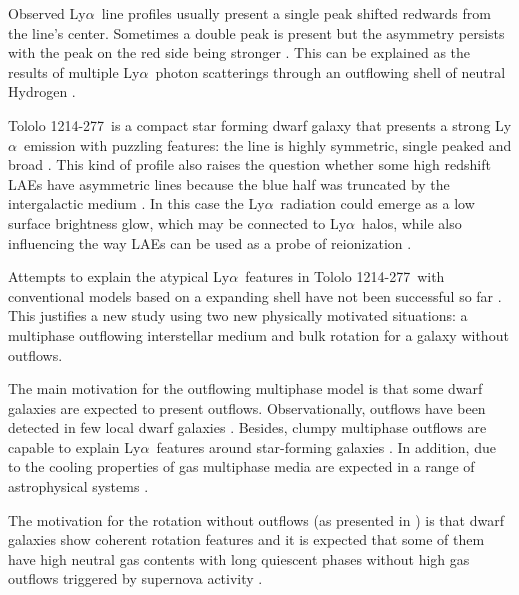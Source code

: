 \documentclass[a4,useAMS,usenatbib,usegraphicx]{mn2e}
\newcommand{\tol}{Tololo 1214-277}
\newcommand{\lya}{\ifmmode{{\rm Ly}\alpha}\else Ly$\alpha$\ \fi}
\begin{document}
Observed \lya line profiles usually present a single peak shifted
redwards from the line's center. 
Sometimes a double peak is present but the asymmetry persists with 
the peak on the red side being stronger \citep[e.g.][]{2010ApJ...717..289S,Erb14,Trainor16}. 
This can be explained as the results of multiple \lya photon
scatterings through an outflowing shell of neutral Hydrogen
\citep{2006A&A...460..397V,Orsi12,2012ApJ...751...29Y,2015ApJ...812..123G}.

\tol\ is a compact star forming dwarf galaxy that presents a
strong \lya emission with puzzling 
features: the line is highly symmetric, single peaked and broad 
\citep{Thuan97}.
This kind of profile also raises the question whether some high
redshift LAEs have asymmetric lines because the blue half was
truncated by the intergalactic medium \citep{2007MNRAS.377.1175D}. 
In this case the \lya radiation could emerge as a low surface
brightness glow, which may be connected to \lya halos, while also
influencing the way LAEs can be used as a probe of reionization
\citep[see the review by][and references therein]{2014PASA...31...40D}. 

Attempts to explain the atypical \lya features in \tol\ with
conventional models based on a expanding shell have not been successful
so far \citep{mashesse03,2015A&A...578A...7V}. 
This justifies a new study using two new physically motivated
situations: a multiphase outflowing interstellar medium and bulk rotation for a
galaxy without outflows.

The main motivation for the outflowing multiphase model \citep[as presented
in][]{Gronke2016} is that some dwarf galaxies are expected to
present outflows.  
Observationally, outflows have been detected in few local dwarf galaxies
\citep{1998ApJ...506..222M,2005MNRAS.358.1453O}. 
Besides, clumpy multiphase outflows are capable to explain \lya features around
star-forming galaxies
\citep{2010ApJ...717..289S,2012MNRAS.424.1672D}.
In addition, due to the cooling properties of gas multiphase media are expected
in a range of astrophysical systems
\citep[][]{1977ApJ...218..148M,2016arXiv161001164M}. 

The motivation for the rotation without outflows (as presented in
\cite{GaravitoCamargo2014}) is that dwarf galaxies show coherent
rotation features  \citep{2009A&A...493..871S} and it is expected that
some of them have high neutral gas contents with long quiescent phases
without high gas outflows triggered by supernova activity
\citep{2005A&A...433L...1B,2008ApJ...672..888T,2013MNRAS.434.2491G}.   
\end{document}
